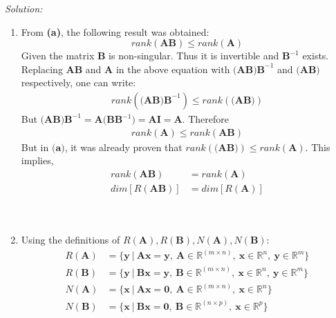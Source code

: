 \documentclass[fleqn]{article}
\newenvironment{solution}
    {\textit{Solution:}}
    {}
\begin{document}
\begin{solution}
\begin{enumerate}[label=(\alph*)]
    \\\\
    \item From \textbf{(a)}, the following result was obtained:
    \begin{equation*}
        rank(\textbf{A}\textbf{B}) \leq rank(\textbf{A})
    \end{equation*}
    Given the matrix $\textbf{B}$ is non-singular. Thus it is invertible and $\textbf{B}^{-1}$ exists.\\
    Replacing $\textbf{AB}$ and $\textbf{A}$ in the above equation with $\textbf{(AB)B}^{-1}$ and $\textbf{(AB)}$ respectively, one can write:
    \begin{equation*}
        \begin{split}
            rank(\textbf{(AB)B}^{-1}) \leq rank(\textbf{(AB)})
        \end{split}
    \end{equation*}
    But $\textbf{(AB)B}^{-1} = \textbf{A(B}\textbf{B}^{-1}\textbf{)} = \textbf{AI} = \textbf{A}$. Therefore
    \begin{equation*}
        \begin{split}
            rank(\textbf{A}) \leq rank(\textbf{AB})
        \end{split}
    \end{equation*}
    But in $\textbf{(a)}$, it was already proven that $rank(\textbf{(AB)}) \leq rank(\textbf{A})$. This implies,
    \begin{equation*}
        \begin{split}
            rank(\textbf{AB}) &= rank(\textbf{A})\\
            dim[R(\textbf{AB})] &= dim[R(\textbf{A})]
        \end{split}
    \end{equation*}
    \\\\
    \item Using the definitions of $R(\textbf{A}), R(\textbf{B}), N(\textbf{A}), N(\textbf{B})$:
    \begin{equation*}
        \begin{split}
           R(\textbf{A}) &= \{\textbf{y} ~|~ \textbf{Ax} = \textbf{y}, ~\textbf{A} \in \mathbb{R}^{(m \times n)},~ \textbf{x} \in \mathbb{R}^{n},~ \textbf{y} \in \mathbb{R}^{m} \} \\
           R(\textbf{B}) &= \{\textbf{y} ~|~ \textbf{Bx} = \textbf{y}, ~\textbf{B} \in \mathbb{R}^{(m \times n)},~ \textbf{x} \in \mathbb{R}^{n},~ \textbf{y} \in \mathbb{R}^{m} \} \\
           N(\textbf{A}) &= \{\textbf{x} ~|~ \textbf{Ax} = \textbf{0}, ~\textbf{A} \in \mathbb{R}^{(m \times n)},~ \textbf{x} \in \mathbb{R}^{n} \} \\
           N(\textbf{B}) &= \{\textbf{x} ~|~ \textbf{Bx} = \textbf{0}, ~\textbf{B} \in \mathbb{R}^{(n \times p)},~ \textbf{x} \in \mathbb{R}^{p} \}
        \end{split}
    \end{equation*}


\end{enumerate}
\end{solution}
\end{document}
